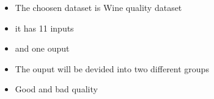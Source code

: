 \begin{itemize}
    \item The choosen dataset is Wine quality dataset
    \item it has 11 inputs
    \item and one ouput
    \item The ouput will be devided into two different groups
    \item Good and bad quality
\end{itemize}